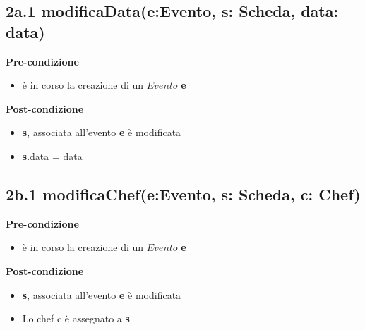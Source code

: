 \documentclass[12pt]{extarticle}
\begin{document}
\subsection*{2a.1 modificaData(e:Evento, s: Scheda, data: data)}

\textbf{Pre-condizione}
\begin{itemize}
  \item è in corso la creazione di un $Evento$ \textbf{e}
\end{itemize} 
\textbf{Post-condizione}
\begin{itemize}
  \item \textbf{s}, associata all'evento \textbf{e} è modificata
  \item \textbf{s}.data = data
\end{itemize} 



\subsection*{2b.1 modificaChef(e:Evento, s: Scheda, c: Chef)}

\textbf{Pre-condizione}
\begin{itemize}
  \item è in corso la creazione di un $Evento$ \textbf{e}
\end{itemize} 
\textbf{Post-condizione}
\begin{itemize}
  \item \textbf{s}, associata all'evento \textbf{e} è modificata
  \item Lo chef c è assegnato a \textbf{s}
\end{itemize} 
\end{document}
